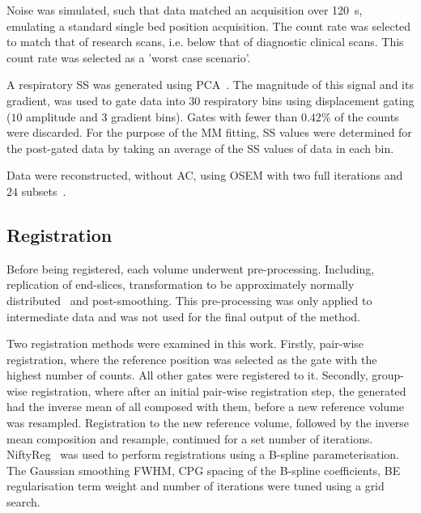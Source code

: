         Noise was simulated, such that data matched an acquisition over \SI{120}{\second}, emulating a standard single bed position acquisition. The count rate was selected to match that of research scans, i.e. below that of diagnostic clinical scans. This count rate was selected as a 'worst case scenario'.
        
        A respiratory \gls{SS} was generated using \gls{PCA}~\cite{Thielemans2011}. The magnitude of this signal and its gradient, was used to gate data into $30$ respiratory bins using displacement gating ($10$ amplitude and $3$ gradient bins). Gates with fewer than $0.42$\% of the counts were discarded. For the purpose of the \gls{MM} fitting, \gls{SS} values were determined for the post-gated data by taking an average of the \gls{SS} values of data in each bin.
        
        Data were reconstructed, without \gls{AC}, using \gls{OSEM} with two full iterations and $24$ subsets~\cite{Hudson1994}.
    
    
    \subsection{Registration} \label{sec:registration}
        Before being registered, each volume underwent pre-processing. Including, replication of end-slices, transformation to be approximately normally distributed~\cite{Johnson2013} and post-smoothing. This pre-processing was only applied to intermediate data and was not used for the final output of the method.%
        
        Two registration methods were examined in this work. Firstly, pair-wise registration, where the reference position was selected as the gate with the highest number of counts. All other gates were registered to it. Secondly, group-wise registration, where after an initial pair-wise registration step, the  generated had the inverse mean of all  composed with them, before a new reference volume was resampled. Registration to the new reference volume, followed by the inverse mean composition and resample, continued for a set number of iterations. NiftyReg~\cite{Modat2010} was used to perform registrations using a B-spline parameterisation. The Gaussian smoothing \gls{FWHM}, \acrlong{CPG} spacing of the B-spline coefficients, \acrlong{BE} regularisation term weight and number of iterations were tuned using a grid search.
    

